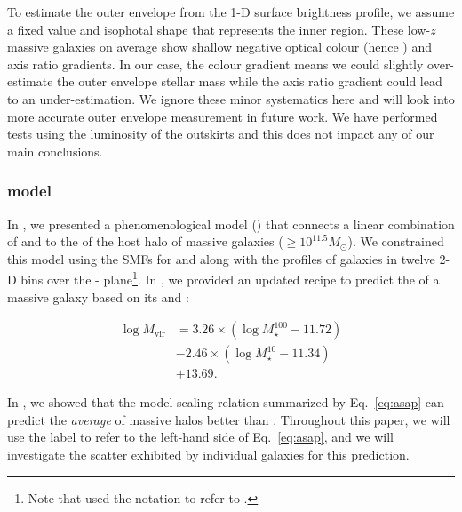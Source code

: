 \documentclass[fleqn,usenatbib,useAMS]{mnras}
\begin{document}
\begin{CJK*}{UTF8}{gbsn}
    To estimate the outer envelope \mstar{} from the 1-D surface brightness profile, we
    assume a fixed \mlratio{} value and isophotal shape that represents the inner region.
    These low-$z$ massive galaxies on average show shallow negative optical colour (hence \mlratio{})
    and axis ratio gradients. 
    In our case, the colour gradient means we could slightly over-estimate the outer envelope stellar
    mass while the axis ratio gradient could lead to an under-estimation.
    We ignore these minor systematics here and will look into more accurate outer envelope \mstar{}
    measurement in future work.
    We have performed \topn{} tests using the luminosity of the outskirts and this does not impact
    any of our main conclusions.

\subsubsection{\asap{} model}
    \label{sec:masap}

    In \citet{Huang2020}, we presented a phenomenological model (\asap{}) that connects a linear
    combination of  and  to the \mvir{} of the host halo of massive galaxies
    ($\geq 10^{11.5} M_{\odot}$).
    We constrained this model using the SMFs for  and  along with the \dsigma{}
    profiles of galaxies in twelve 2-D bins over the - plane\footnote{Note that
    \citet{Huang2020} used the notation \mmax{} to refer to .}.
    In \citet{Ardila2021}, we provided an updated \asap{} recipe to predict the \mvir{} of a
    massive galaxy based on its  and :

    \begin{equation}
        \begin{aligned}
        \log M_{\mathrm{vir}} &=3.26 \times\left(\log M_{\star}^{100}-11.72\right) \\
        &-2.46 \times\left(\log M_{\star}^{10}-11.34\right) \\
        &+13.69.
        \end{aligned}
        \label{eq:asap}
    \end{equation}

    In \citealt{Huang2020}, we showed that the \asap{} model scaling relation summarized by
    Eq.~\ref{eq:asap} can predict the {\em average} \mvir{} of massive halos better than
    . 
    Throughout this paper, we will use the label \masap{} to refer to the left-hand side of
    Eq.~\ref{eq:asap}, and we will investigate the scatter exhibited by individual galaxies for this
    \asap{} prediction.


\end{CJK*}
\end{document}
